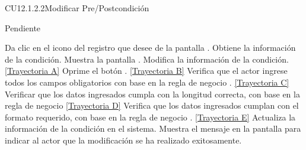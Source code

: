 \begin{UseCase}{CU12.1.2.2}{Modificar Pre/Postcondición}{
		
		Pendiente
		
	}
{\begin{itemize}
		\end{itemize}
	}
\end{UseCase}
\begin{UCtrayectoria}
	\UCpaso[\UCactor] Da clic en el icono \editar del registro que desee de la pantalla .
	\UCpaso[\UCsist] Obtiene la información de la condición.
	\UCpaso[\UCsist] Muestra la pantalla .
	\UCpaso[\UCactor] Modifica la información de la condición. \hyperlink{CU12-1-2-2:TAA}{[Trayectoria A]} \label{CU12.1.2.2-P3}
	\UCpaso[\UCactor] Oprime el botón . \hyperlink{CU12-1-2-2:TAB}{[Trayectoria B]} \label{CU12.1.2.2-P4}
	\UCpaso[\UCsist] Verifica que el actor ingrese todos los campos obligatorios con base en la regla de negocio . \hyperlink{CU12-1-2-2:TAC}{[Trayectoria C]}
	\UCpaso[\UCsist] Verificar que los datos ingresados cumpla con la longitud correcta, con base en la regla de negocio  \hyperlink{CU12-1-2-2:TAD}{[Trayectoria D]}
	\UCpaso[\UCsist] Verifica que los datos ingresados cumplan con el formato requerido, con base en la regla de negocio . \hyperlink{CU12-1-2-2:TAE}{[Trayectoria E]}
	\UCpaso[\UCsist] Actualiza la información de la condición en el sistema.
	\UCpaso[\UCsist] Muestra el mensaje  en la pantalla  para indicar al actor que la modificación se ha realizado exitosamente.
\end{UCtrayectoria}		
